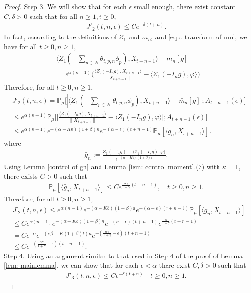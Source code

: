 \documentclass[12pt,a4paper]{amsart}
\theoremstyle{plain}
\theoremstyle{definition}
\numberwithin{equation}{section}
\begin{document}
\begin{proof}
    Step 3.
	We will show that for each $\epsilon$ small enough, there exist constant $C,\delta>0$ such that for all $n\geq 1, t\geq 0$, 
\begin{align}
\label{eq:31step31}
    J'_2(t,n,\epsilon)
    \leq C e^{-\delta(t+n)}.
\end{align}
    In fact, according to the definitions of $Z_1$ and $\bar{m}_n$, and \eqref{equ: transform of mn}, we have for all $t\geq 0, n\geq1$, 
\begin{align}
    &\langle Z_1(-\sum_{p\in \mathcal{N}}\theta_{t,p,n}\phi_p), X_{t+n-1}\rangle-\bar{m}_n[g]\\
    &=e^{\alpha(n-1)}\Big(\frac{\langle Z_1(-I_ng),X_{t+n-1}\rangle}{\|X_{t+n-1}\|}-\langle Z_1(-I_ng),\varphi\rangle\Big).
\end{align}
Therefore, for all $t\geq 0, n\geq1$, 
\begin{align}
    &J'_2(t,n,\epsilon)
	= \mathbb{P}_{\mu}\big[|\langle Z_1(-\sum_{p\in\mathcal{N}}\theta_{t,p,n}\phi_p),X_{t+n-1}\rangle-\bar{m}_n[g]|; A_{t+n-1}(\epsilon)\big]\\
	&\leq e^{\alpha(n-1)}\mathbb{P}_{\mu}\Big[\big|\frac{\langle Z_1(-I_ng),X_{t+n-1}\rangle}{\|X_{t+n-1}\|}-\langle Z_1(-I_ng),\varphi\rangle\big|;A_{t+n-1}(\epsilon)\Big]\\
	&\leq e^{\alpha(n-1)}e^{-(\alpha-Kb)(1+\beta)n}e^{-(\alpha-\epsilon)(t+n-1)}\mathbb{P}_{\mu}
    [\langle \bar {g}_n, X_{t+n-1}\rangle].
\end{align}
    where
\begin{align}
    \bar{g}_n
    :=\frac{Z_1(-I_ng)-\langle Z_1(-I_ng),\varphi\rangle}{e^{-(\alpha-Kb)(1+\beta)n}}.
\end{align}
    Using Lemma \ref{control of gn} and Lemma \ref{lem: control moment}.(3) with $\kappa=1$, there exists $C>0$ such that
\begin{align}
    \mathbb{P}_{\mu}[\langle \bar{g}_n, X_{t+n-1}\rangle]
    \leq Ce^{\frac{\alpha \gamma}{1+\gamma}(t+n-1)},\quad t\geq0, n\geq 1.
\end{align}
    Therefore, for all $t\geq 0, n\geq1$, 
\begin{align}
    &J'_2(t,n,\epsilon)\leq e^{\alpha(n-1)}e^{-(\alpha-Kb)(1+\beta)n}e^{-(\alpha-\epsilon)(t+n-1)}\mathbb{P}_{\mu}[\langle \bar{g}_n, X_{t+n-1}\rangle]\\
    &\leq C e^{\alpha(n-1)}e^{-(\alpha-Kb)(1+\beta)n}e^{-(\alpha-\epsilon)(t+n-1)}e^{\frac{\alpha }{1+\gamma}(t+n-1)}\\
    &=Ce^{-\alpha}e^{-(\alpha\beta-K(1+\beta)b)n}e^{-(\frac{\alpha\gamma}{1+\gamma}-\epsilon)(t+n-1)}\\&\leq Ce^{-(\frac{\alpha\gamma}{1+\gamma}-\epsilon)(t+n-1)}.
\end{align}
	Step 4. Using an argument similar to that used in Step 4 of the proof of  Lemma \ref{lem: mainlemma}, we can show that for each $\epsilon< \alpha$ there exist $C,\delta>0$ such that
\begin{align}\label{ineq: control of J31}
    J'_3(t,n,\epsilon)\leq Ce^{-\delta (t+n)}\quad t\geq0, n\geq 1.
\end{align}


\end{proof}
\end{document}
